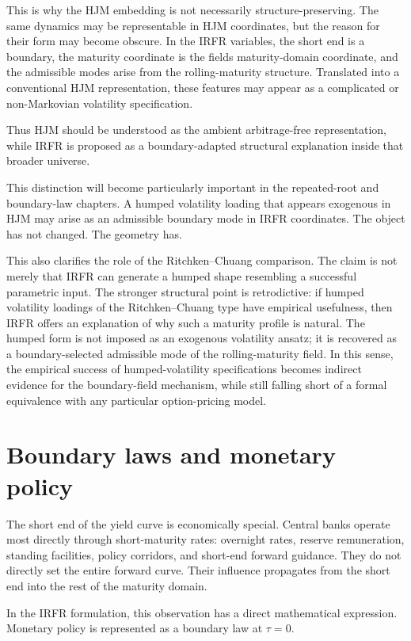 \documentclass[11pt,oneside]{book}
\begin{document}
This is why the HJM embedding is not necessarily structure-preserving.
The same dynamics may be representable in HJM coordinates, but the
reason for their form may become obscure. In the IRFR variables, the
short end is a boundary, the maturity coordinate is the
field\textquotesingle s maturity-domain coordinate, and the admissible
modes arise from the rolling-maturity structure. Translated into a
conventional HJM representation, these features may appear as a
complicated or non-Markovian volatility specification.

Thus HJM should be understood as the ambient arbitrage-free
representation, while IRFR is proposed as a boundary-adapted structural
explanation inside that broader universe.

This distinction will become particularly important in the repeated-root
and boundary-law chapters. A humped volatility loading that appears
exogenous in HJM may arise as an admissible boundary mode in IRFR
coordinates. The object has not changed. The geometry has.

This also clarifies the role of the Ritchken--Chuang comparison. The claim is not merely that IRFR can generate a humped shape resembling a successful parametric input. The stronger structural point is retrodictive: if humped volatility loadings of the Ritchken--Chuang type have empirical usefulness, then IRFR offers an explanation of why such a maturity profile is natural. The humped form is not imposed as an exogenous volatility ansatz; it is recovered as a boundary-selected admissible mode of the rolling-maturity field. In this sense, the empirical success of humped-volatility specifications becomes indirect evidence for the boundary-field mechanism, while still falling short of a formal equivalence with any particular option-pricing model.

\section{Boundary laws and monetary policy}\label{boundary-laws-and-monetary-policy}

The short end of the yield curve is economically special. Central banks
operate most directly through short-maturity rates: overnight rates,
reserve remuneration, standing facilities, policy corridors, and
short-end forward guidance. They do not directly set the entire forward
curve. Their influence propagates from the short end into the rest of
the maturity domain.

In the IRFR formulation, this observation has a direct mathematical
expression. Monetary policy is represented as a boundary law at $\tau=0$.
\end{document}
